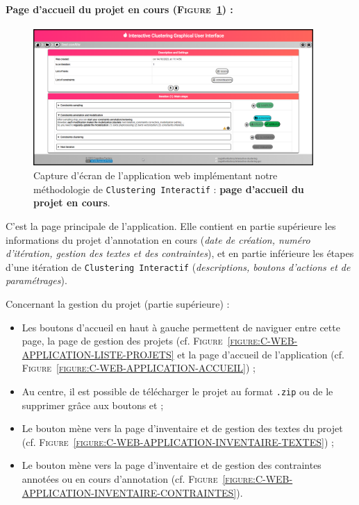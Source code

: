 	
	\newpage
	\paragraph{Page d'accueil du projet en cours (\textsc{Figure~\ref{figure:C-WEB-APPLICATION-ACCUEIL-PROJET}}) :}
		
		\begin{figure}[H]
			\centering
			\includegraphics[width=0.95\textwidth]{figures/interactive-clustering-application-accueil-projet}
			\caption{
				Capture d'écran de l'application web implémentant notre méthodologie de \texttt{Clustering Interactif} : \textbf{page d'accueil du projet en cours}.
			}
			\label{figure:C-WEB-APPLICATION-ACCUEIL-PROJET}
		\end{figure}
		
		C'est la page principale de l'application.
		Elle contient en partie supérieure les informations du projet d'annotation en cours (\textit{date de création, numéro d'itération, gestion des textes et des contraintes}), et en partie inférieure les étapes d'une itération de \texttt{Clustering Interactif} (\textit{descriptions, boutons d'actions et de paramétrages}).
		
		Concernant la gestion du projet (partie supérieure) :
		\begin{itemize}
			\item Les boutons d'accueil en haut à gauche permettent de naviguer entre cette page, la page de gestion des projets (cf. \textsc{Figure~\ref{figure:C-WEB-APPLICATION-LISTE-PROJETS}} et la page d'accueil de l'application (cf. \textsc{Figure~\ref{figure:C-WEB-APPLICATION-ACCUEIL}}) ;
			\item Au centre, il est possible de télécharger le projet au format \texttt{.zip} ou de le supprimer grâce aux boutons \textguillemets{\faDownload} et \textguillemets{\faTrash} ;
			\item Le bouton  mène vers la page d'inventaire et de gestion des textes du projet (cf. \textsc{Figure~\ref{figure:C-WEB-APPLICATION-INVENTAIRE-TEXTES}}) ;
			\item Le bouton  mène vers la page d'inventaire et de gestion des contraintes annotées ou en cours d'annotation (cf. \textsc{Figure~\ref{figure:C-WEB-APPLICATION-INVENTAIRE-CONTRAINTES}}).
		\end{itemize}
		
